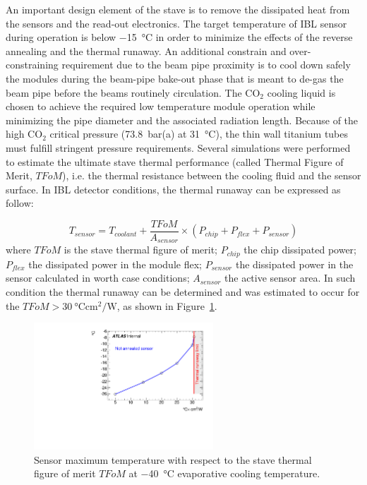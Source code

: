 An important design element of the stave is to remove the dissipated heat from the sensors and the read-out electronics. The target temperature of IBL sensor during operation is below \SI{-15}{\celsius}  in order to minimize the effects of the reverse annealing and the thermal runaway. An additional constrain and over-constraining requirement due to the beam pipe proximity is to cool down safely the modules during the beam-pipe bake-out phase that is meant to de-gas the beam pipe before the beams routinely circulation.
The CO$_2$ cooling liquid is chosen to achieve the required low temperature module operation while minimizing the pipe diameter and the associated radiation length. Because of the high CO$_2$ critical pressure (\SI{73.8}{\bar}(a) at \SI{31}{\celsius}), the thin wall titanium tubes must fulfill stringent pressure requirements.
Several simulations were performed to estimate the ultimate stave thermal performance (called Thermal Figure of Merit, $TFoM$), i.e. the thermal resistance between the cooling fluid and the sensor surface. In IBL detector conditions, the thermal runaway can be expressed as follow:

\begin{equation}
T_{sensor} = T_{coolant} + \frac{TFoM}{A_{sensor}} \times  (P_{chip} + P_{flex} + P_{sensor} )
\end{equation}
where $TFoM$ is the stave thermal figure of merit; $P_{chip}$ the chip dissipated power; $P_{flex}$ the dissipated power in the module flex; $P_{sensor}$ the dissipated power in the sensor calculated in worth case conditions; $A_{sensor}$ the  active sensor area.
In such condition the thermal runaway can be determined and was estimated to occur for the $TFoM > \SI{30}{\celsius\centi\meter^2\per\watt}$, as shown in Figure~\ref{fig:ThermalRunAway}.

\begin{figure}
\begin{center}
 \includegraphics[width=0.6\textwidth]{Images/IBL_Paper/chapter05_Staves/ThermalRunAway.pdf}
\caption{Sensor maximum temperature  with respect to the stave thermal figure of merit $TFoM$ at \SI{-40}{\celsius} evaporative cooling temperature.}
\label{fig:ThermalRunAway}
\end{center}
\end{figure}

